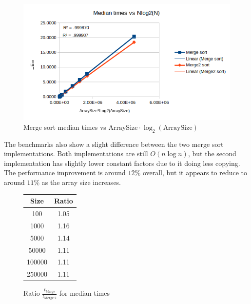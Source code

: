 \documentclass[a4paper,11pt]{article}
\begin{document}
    \begin{figure}[H]
        \centering
        \includegraphics[width=\textwidth]{nlogn.png}
        \caption{Merge sort median times vs $\text{ArraySize}\cdot\log_2{\left(\text{ArraySize}\right)}$}
        \label{fig:nlogn}   
    \end{figure}

    The benchmarks also show a slight difference between the two merge sort implementations. Both implementations are still $O(n \log n)$, but the second implementation has slightly lower constant factors due to it doing less copying. The performance improvement is around $12\%$ overall, but it appears to reduce to around $11\%$ as the array size increases.

    \begin{figure}[H]
        \centering
        \begin{tabular}{c|c}
            Size & Ratio \\
            \hline
            \hline
            100 & 1.05 \\
            \hline
            1000 & 1.16 \\
            \hline
            5000 & 1.14 \\
            \hline
            50000 & 1.11 \\
            \hline
            100000 & 1.11 \\
            \hline
            250000 & 1.11 \\
        \end{tabular}

        \caption{Ratio $\frac{t_{\text{Merge}}}{t_{\text{Merge 2}}}$ for median times}
        \label{fig:merge}
    \end{figure}
\end{document}
